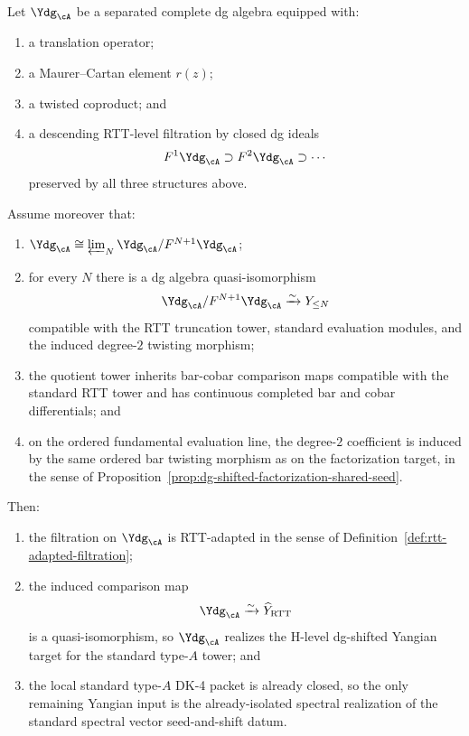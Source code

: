 \begin{proposition}
\label{prop:yangian-typea-realization-criterion}
Let $\Ydg_{\cA}$ be a separated complete dg algebra equipped with:
\begin{enumerate}[label=\textup{(\roman*)}]
\item a translation operator;
\item a Maurer--Cartan element $r(z)$;
\item a twisted coproduct; and
\item a descending RTT-level filtration by closed dg ideals
  \[
  F^1\Ydg_{\cA} \supset F^2\Ydg_{\cA} \supset \cdots
  \]
  preserved by all three structures above.
\end{enumerate}
Assume moreover that:
\begin{enumerate}[label=\textup{(\roman*)},resume]
\item $\Ydg_{\cA}\cong \varprojlim_N \Ydg_{\cA}/F^{N+1}\Ydg_{\cA}$;
\item for every $N$ there is a dg algebra quasi-isomorphism
  \[
  \Ydg_{\cA}/F^{N+1}\Ydg_{\cA}\xrightarrow{\sim}Y_{\le N}
  \]
  compatible with the RTT truncation tower, standard evaluation
  modules, and the induced degree-$2$ twisting morphism;
\item the quotient tower inherits bar-cobar comparison maps compatible
  with the standard RTT tower and has continuous completed bar and
  cobar differentials; and
\item on the ordered fundamental evaluation line, the degree-$2$
  coefficient is induced by the same ordered bar twisting morphism as
  on the factorization target, in the sense of
  Proposition~\ref{prop:dg-shifted-factorization-shared-seed}.
\end{enumerate}
Then:
\begin{enumerate}[label=\textup{(\alph*)}]
\item the filtration on $\Ydg_{\cA}$ is RTT-adapted in the sense of
  Definition~\ref{def:rtt-adapted-filtration};
\item the induced comparison map
  \[
  \Ydg_{\cA}\xrightarrow{\sim}\widehat Y_{\mathrm{RTT}}
  \]
  is a quasi-isomorphism, so $\Ydg_{\cA}$ realizes the H-level
  dg-shifted Yangian target for the standard type-$A$ tower; and
\item the local standard type-$A$ DK-4 packet is already closed, so the
  only remaining Yangian input is the already-isolated spectral
  realization of the standard spectral vector seed-and-shift datum.
\end{enumerate}
\end{proposition}

